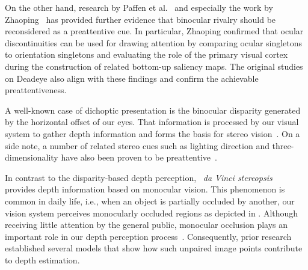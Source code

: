 \documentclass[journal]{vgtc}                %
\begin{document}
On the other hand, research by Paffen et al.~\cite{paffen2012interocular} and especially the work by Zhaoping~\cite{zhaoping2008attention} has provided further evidence that binocular rivalry should be reconsidered as a preattentive cue. In particular, Zhaoping confirmed that ocular discontinuities can be used for drawing attention by comparing ocular singletons to orientation singletons and evaluating the role of the primary visual cortex during the construction of related bottom-up saliency maps. The original studies on Deadeye also align with these findings and confirm the achievable preattentiveness.







A well-known case of dichoptic presentation is the binocular disparity generated by the horizontal offset of our eyes. That information is processed by our visual system to gather depth information and forms the basis for stereo vision~\cite{julesz1960binocular,julesz1971foundations,Caziot:2015:SOM,marr1976cooperative,marr1979computational}. On a side note, a number of related stereo cues such as lighting direction and three-dimensionality have also been proven to be preattentive~\cite{enns1990influence, enns1990sensitivity,o1997preattentive}.


In contrast to the disparity-based depth perception, ~\textit{da Vinci stereopsis}~\cite{NAKAYAMA19901811} provides depth information based on monocular vision. This phenomenon is common in daily life, i.e., when an object is partially occluded by another, our vision system perceives monocularly occluded regions as depicted in . Although receiving little attention by the general public, monocular occlusion plays an important role in our depth perception process~\cite{gillam1999quantitative,liu1997binocular,shimojo1990real,shimojo1994interocularly,harris2009role}. Consequently, prior research~\cite{marr1979computational,cao2005laminar,hayashi2004integrative,zitnick2000cooperative,watanabe1999stereo} established several models that show how such unpaired image points contribute to depth estimation. 
\end{document}
